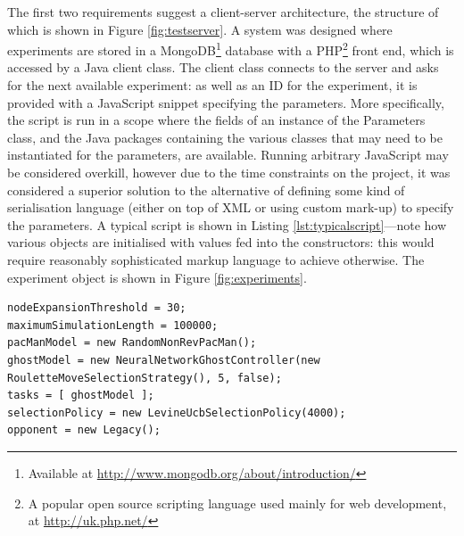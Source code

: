 The first two requirements suggest a client-server architecture, the structure of which is shown in Figure \ref{fig:testserver}.  A system was designed where experiments are stored in a MongoDB\footnote{Available at \url{http://www.mongodb.org/about/introduction/}} database with a PHP\footnote{A popular open source scripting language used mainly for web development, at \url{http://uk.php.net/}} front end, which is accessed by a Java client class.  The client class connects to the server and asks for the next available experiment: as well as an ID for the experiment, it is provided with a JavaScript snippet specifying the parameters.  More specifically, the script is run in a scope where the fields of an instance of the Parameters class, and the Java packages containing the various classes that may need to be instantiated for the parameters, are available.  Running arbitrary JavaScript may be considered overkill, however due to the time constraints on the project, it was considered a superior solution to the alternative of defining some kind of serialisation language (either on top of XML or using custom mark-up) to specify the parameters.  A typical script is shown in Listing \ref{lst:typicalscript}---note how various objects are initialised with values fed into the constructors: this would require reasonably sophisticated markup language to achieve otherwise.  The experiment object is shown in Figure \ref{fig:experiments}.

\begin{lstlisting}[breaklines=true,caption={A typical parameters script},captionpos=b,label=lst:typicalscript,float]
nodeExpansionThreshold = 30;
maximumSimulationLength = 100000;
pacManModel = new RandomNonRevPacMan();
ghostModel = new NeuralNetworkGhostController(new RouletteMoveSelectionStrategy(), 5, false);
tasks = [ ghostModel ];
selectionPolicy = new LevineUcbSelectionPolicy(4000);
opponent = new Legacy();
\end{lstlisting}

